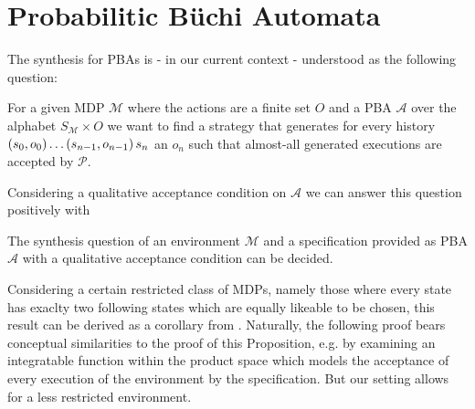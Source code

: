 \section{Probabilitic Büchi Automata}
The synthesis for \acp{PBA} is - in our current context - understood as the
following question:
\begin{definition}
  For a given \ac{MDP} $\mathcal{M}$ where the actions are a finite set $O$ and
  a \ac{PBA} $\mathcal{A}$ over the alphabet $S_{\mathcal{M}}\times O$ we want
  to find a strategy that generates for every history
  $\left(s_{0}, o_{0}\right)\dots\left(s_{n-1},o_{n-1}\right)s_{n}$ an
  $o_{n}$ such that almost-all generated executions are accepted by
  $\mathcal{P}$.
  \label{def:synthesis}
\end{definition}
Considering a qualitative acceptance condition on $\mathcal{A}$ we can answer
this question positively with
\begin{theorem}
  The synthesis question of an environment $\mathcal{M}$ and a specification
  provided as \ac{PBA} $\mathcal{A}$ with a qualitative acceptance condition
  can be decided.
  \label{thm:synthesis}
\end{theorem}
Considering a certain restricted class of \acp{MDP}, namely those where every
state has exaclty two following states which are equally likeable to be chosen,
this result can be derived as a corollary from
\cite[Proposition 43]{RandAutoInfTrees}. Naturally, the following proof bears
conceptual similarities to the proof of this Proposition, e.g. by examining an
integratable function within the product space which models the acceptance of
every execution of the environment by the specification. But our setting allows
for a less restricted environment.

